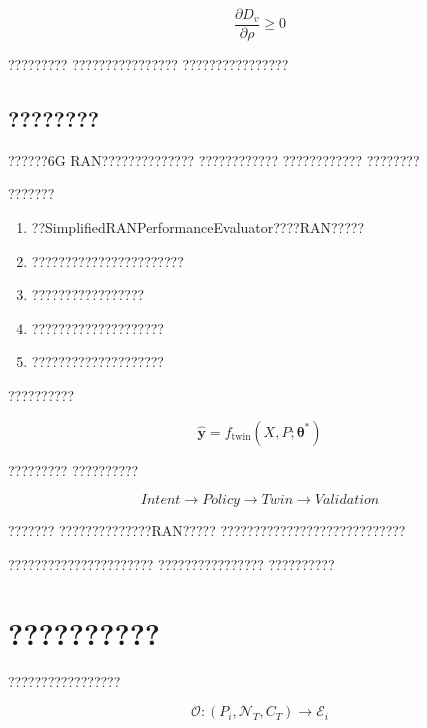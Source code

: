 \begin{equation}
\frac{\partial D_v}{\partial \rho}
\geq0
\end{equation}


?????????
????????????????
????????????????



\subsection*{????????}

??????6G RAN??????????????
????????????
????????????
????????

???????

\begin{enumerate}

\item ??SimplifiedRANPerformanceEvaluator????RAN?????

\item ???????????????????????

\item ?????????????????

\item ????????????????????

\item ????????????????????

\end{enumerate}


??????????

\begin{equation}
\hat{\boldsymbol{y}}
=
f_{\mathrm{twin}}
(
X,P;
\boldsymbol{\theta}^{*}
)
\end{equation}


?????????
??????????

\begin{equation}
Intent
\rightarrow
Policy
\rightarrow
Twin
\rightarrow
Validation
\end{equation}

???????
??????????????RAN?????
????????????????????????????

??????????????????????
????????????????
??????????

\section{??????????}
\label{sec:twin_environment_orchestration}

?????????????????

\begin{equation}
\mathcal{O}
:
(P_i,\mathcal{N}_{T},C_T)
\rightarrow
\mathcal{E}_i
\end{equation}

